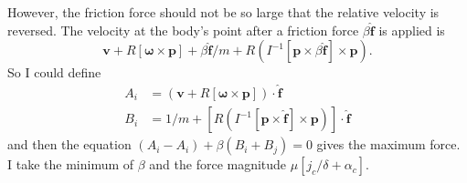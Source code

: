 \documentclass[11pt,twocolumn]{article}
\newcommand{\unit}[1]{\hat{\bm {#1}}}
\begin{document}
    However, the friction force should not be so large that the relative velocity is reversed. The velocity at the body's point after a friction force $\beta\unit f$ is applied is
    \begin{equation}
      \bm v + R[\bm \omega \times \bm p] + \beta \unit f/ m + R (I^{-1} [\bm p \times \beta \unit f] \times \bm p).
    \end{equation}
    So I could define 
    \begin{align}
      A_i &= (\bm v + R[\bm \omega \times \bm p]) \cdot \unit f\\
      B_i &= 1/m + [R(I^{-1}[\bm p \times \unit f] \times \bm p)] \cdot \unit f
    \end{align}
    and then the equation $(A_i - A_i) + \beta (B_i + B_j) = 0$ gives the maximum force. I take the minimum of $\beta$ and the force magnitude $\mu [j_c / \delta + \alpha_c]$.
\end{document}
